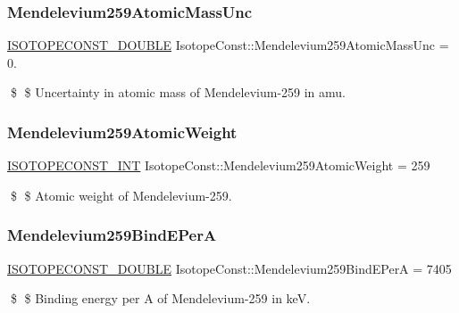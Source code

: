 \subsubsection{\texorpdfstring{Mendelevium259\+Atomic\+Mass\+Unc}{Mendelevium259AtomicMassUnc}}
{\footnotesize\ttfamily \mbox{\hyperlink{group___isotope_const-_macros_ga8f45a7272ce02c0b4c65c44636ed719a}{I\+S\+O\+T\+O\+P\+E\+C\+O\+N\+S\+T\+\_\+\+D\+O\+U\+B\+LE}} Isotope\+Const\+::\+Mendelevium259\+Atomic\+Mass\+Unc = 0.}

\$ \$ Uncertainty in atomic mass of Mendelevium-\/259 in amu. \mbox{\label{group___isotope_const-_mendelevium-_md259_gaa56e48a7998ad1db51d8b112eb407063}} 
\subsubsection{\texorpdfstring{Mendelevium259\+Atomic\+Weight}{Mendelevium259AtomicWeight}}
{\footnotesize\ttfamily \mbox{\hyperlink{group___isotope_const-_macros_ga5f18360b3e99483a35c32d789e62621c}{I\+S\+O\+T\+O\+P\+E\+C\+O\+N\+S\+T\+\_\+\+I\+NT}} Isotope\+Const\+::\+Mendelevium259\+Atomic\+Weight = 259}

\$ \$ Atomic weight of Mendelevium-\/259. \mbox{\label{group___isotope_const-_mendelevium-_md259_gaf2dd868cde904e54e40e0b282589e81a}} 
\subsubsection{\texorpdfstring{Mendelevium259\+Bind\+E\+PerA}{Mendelevium259BindEPerA}}
{\footnotesize\ttfamily \mbox{\hyperlink{group___isotope_const-_macros_ga8f45a7272ce02c0b4c65c44636ed719a}{I\+S\+O\+T\+O\+P\+E\+C\+O\+N\+S\+T\+\_\+\+D\+O\+U\+B\+LE}} Isotope\+Const\+::\+Mendelevium259\+Bind\+E\+PerA = 7405}

\$ \$ Binding energy per A of Mendelevium-\/259 in keV. \mbox{\label{group___isotope_const-_mendelevium-_md259_ga1385872b377e463a5fcd5fb5ffbbddab}} 
